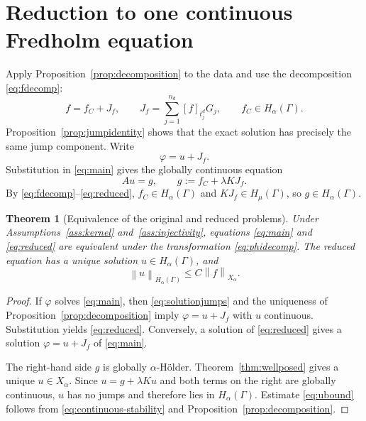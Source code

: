 \documentclass[11pt,a4paper]{amsart}
\theoremstyle{plain}
\newtheorem{theorem}{Theorem}[section]
\theoremstyle{definition}
\theoremstyle{remark}
\newcommand{\Ga}{\Gamma}
\newcommand{\norm}[1]{\left\|#1\right\|}
\begin{document}
\section{Reduction to one continuous Fredholm equation}\label{sec:reduction}

Apply Proposition~\ref{prop:decomposition} to the data and use the decomposition \eqref{eq:fdecomp}:
\begin{equation}\label{eq:fdecomp}
        f=f_C+J_f,
        \qquad
        J_f=\sum_{j=1}^{n_d}[f]_{t_j^d}G_j,
        \qquad f_C\in H_\alpha(\Ga).
\end{equation}
Proposition~\ref{prop:jumpidentity} shows that the exact solution has precisely the same jump component.  Write
\begin{equation}\label{eq:phidecomp}
        \varphi=u+J_f.
\end{equation}
Substitution in \eqref{eq:main} gives the globally continuous equation
\begin{equation}\label{eq:reduced}
        Au=g,
        \qquad
        g:=f_C+\lambda KJ_f.
\end{equation}
By \eqref{eq:fdecomp}--\eqref{eq:reduced}, $f_C\in H_\alpha(\Ga)$ and $KJ_f\in H_\mu(\Ga)$, so $g\in H_\alpha(\Ga)$.

\begin{theorem}[Equivalence of the original and reduced problems]\label{thm:reduction}
Under Assumptions~\ref{ass:kernel} and~\ref{ass:injectivity}, equations \eqref{eq:main} and \eqref{eq:reduced} are equivalent under the transformation \eqref{eq:phidecomp}.  The reduced equation has a unique solution $u\in H_\alpha(\Ga)$, and
\begin{equation}\label{eq:ubound}
        \norm{u}_{H_\alpha(\Ga)}
        \le C\norm{f}_{X_\alpha}.
\end{equation}
\end{theorem}

\begin{proof}
If $\varphi$ solves \eqref{eq:main}, then \eqref{eq:solutionjumps} and the uniqueness of Proposition~\ref{prop:decomposition} imply $\varphi=u+J_f$ with $u$ continuous.  Substitution yields \eqref{eq:reduced}.  Conversely, a solution of \eqref{eq:reduced} gives a solution $\varphi=u+J_f$ of \eqref{eq:main}.

The right-hand side $g$ is globally $\alpha$-H\"older.  Theorem~\ref{thm:wellposed} gives a unique $u\in X_\alpha$.  Since $u=g+\lambda Ku$ and both terms on the right are globally continuous, $u$ has no jumps and therefore lies in $H_\alpha(\Ga)$.  Estimate \eqref{eq:ubound} follows from \eqref{eq:continuous-stability} and Proposition~\ref{prop:decomposition}.
\end{proof}
\end{document}
